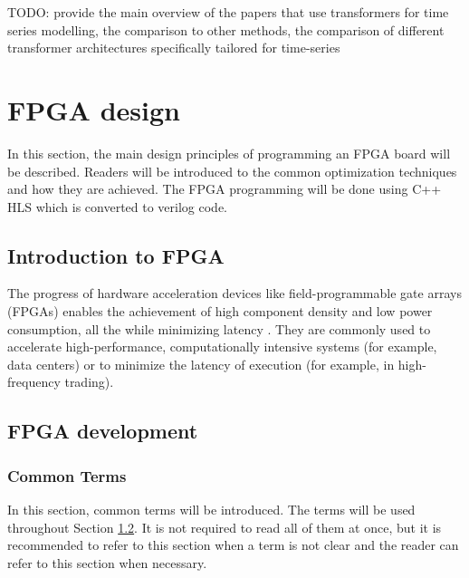 \documentclass[a4paper, twoside]{report}
\theoremstyle{definition}
\numberwithin{equation}{section}
\begin{document}
TODO: provide the main overview of the papers that use transformers for time series modelling,
the comparison to other methods, the comparison of different transformer architectures specifically
tailored for time-series


\section{FPGA design}


In this section, the main design principles of programming an FPGA board will be described. Readers will be introduced to the common optimization techniques and how they are achieved. The FPGA programming will be done using C++ HLS which is converted to verilog code.

\subsection{Introduction to FPGA}


The progress of hardware acceleration devices like field-programmable gate arrays (FPGAs) enables the achievement of high component density and low power consumption, all the while minimizing latency \cite{10.1007/978-3-319-56258-2_14}. They are commonly used to accelerate high-performance, computationally intensive systems (for example, data centers) or to minimize the latency of execution (for example, in high-frequency trading).

\subsection{FPGA development} \label{sec:fpga_development}

\subsubsection{Common Terms}

In this section, common terms will be introduced.
The terms will be used throughout Section \ref{sec:fpga_development}.
It is not required to read all of them at once, but it is recommended to refer to this section
when a term is not clear and the reader can refer to this section when necessary.
\end{document}
